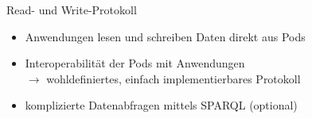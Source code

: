 




\begin{frame}{Read- und Write-Protokoll \footnotesize\cite{mecklerWebLinkedData2023,sambraSolidPlatformDecentralized2016}}
    \begin{itemize}
        \item Anwendungen lesen und schreiben Daten direkt aus Pods
        \item Interoperabilität der Pods mit Anwendungen\\
        $\to$ wohldefiniertes, einfach implementierbares Protokoll\\
        \item<3-> komplizierte Datenabfragen mittels SPARQL (optional)
    \end{itemize}
\end{frame}

